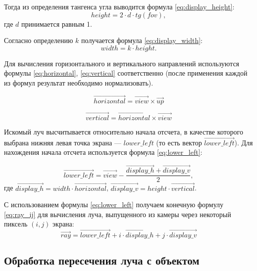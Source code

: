 Тогда из определения тангенса угла выводится формула \ref{eq:display_height}:
\begin{equation}\label{eq:display_height}
	height = 2 \cdot d \cdot tg(fov),
\end{equation}
где $d$ принимается равным 1.

Согласно определению $k$ получается формула \ref{eq:display_width}:
\begin{equation}\label{eq:display_width}
	width = k \cdot height.
\end{equation}

Для вычисления горизонтального и вертикального направлений используются формулы \ref{eq:horizontal}, \ref{eq:vertical} соответственно (после применения каждой из формул результат необходимо нормализовать).

\begin{equation}\label{eq:horizontal}
	\overrightarrow{horizontal} = \overrightarrow{view} \times \overrightarrow{up}
\end{equation}

\begin{equation}\label{eq:vertical}
	\overrightarrow{vertical} = \overrightarrow{horizontal} \times \overrightarrow{view}
\end{equation}

Искомый луч высчитывается относительно начала отсчета, в качестве которого выбрана нижняя левая точка экрана --- $lower\_left$ (то есть вектор $\overrightarrow{lower\_left}$).
Для нахождения начала отсчета используется формула \ref{eq:lower_left}:

\begin{equation}\label{eq:lower_left}
	\overrightarrow{lower\_left} = \overrightarrow{view} - \frac{\overrightarrow{display\_h} + \overrightarrow{display\_v}}{2},
\end{equation}
где $\overrightarrow{display\_h} = width \cdot \overrightarrow{horizontal}$, $\overrightarrow{display\_v} = height \cdot \overrightarrow{vertical}$.

С использованием формулы \ref{eq:lower_left} получаем конечную формулу \ref{eq:ray_ij} для вычисления луча, выпущенного из камеры через некоторый пиксель $(i, j)$ экрана:
\begin{equation}\label{eq:ray_ij}
	\overrightarrow{ray} = \overrightarrow{lower\_left} + i \cdot \overrightarrow{display\_h} + j \cdot \overrightarrow{display\_v}
\end{equation}

\subsection{Обработка пересечения луча с объектом}

